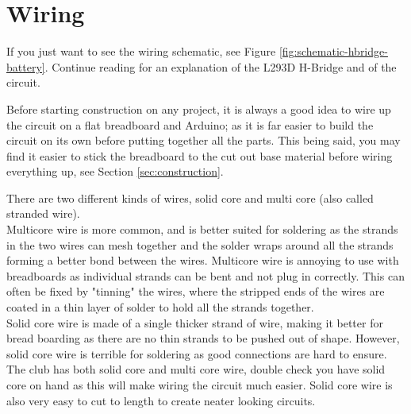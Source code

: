 \documentclass[../TinyBot.tex]{subfiles}
\begin{document}
\section{Wiring} \label{wiring}
If you just want to see the wiring schematic, see Figure \ref{fig:schematic-hbridge-battery}. Continue reading for an explanation of the L293D H-Bridge and of the circuit. 

\bigskip

Before starting construction on any project, it is always a good idea to wire up the circuit on a flat breadboard and Arduino; as it is far easier to build the circuit on its own before putting together all the parts. This being said, you may find it easier to stick the breadboard to the cut out base material before wiring everything up, see Section \ref{sec:construction}. \\

\begin{notebox}
    There are two different kinds of wires, solid core and multi core (also called stranded wire). \\

    
    Multicore wire is more common, and is better suited for soldering as the strands in the two wires can mesh together and the solder wraps around all the strands forming a better bond between the wires. Multicore wire is annoying to use with breadboards as individual strands can be bent and not plug in correctly. This can often be fixed by "tinning" the wires, where the stripped ends of the wires are coated in a thin layer of solder to hold all the strands together.\\

    Solid core wire is made of a single thicker strand of wire, making it better for bread boarding as there are no thin strands to be pushed out of shape. However, solid core wire is terrible for soldering as good connections are hard to ensure. \\



    The club has both solid core and multi core wire, double check you have solid core on hand as this will make wiring the circuit much easier. Solid core wire is also very easy to cut to length to create neater looking circuits. \\
    
\end{notebox}
\end{document}
